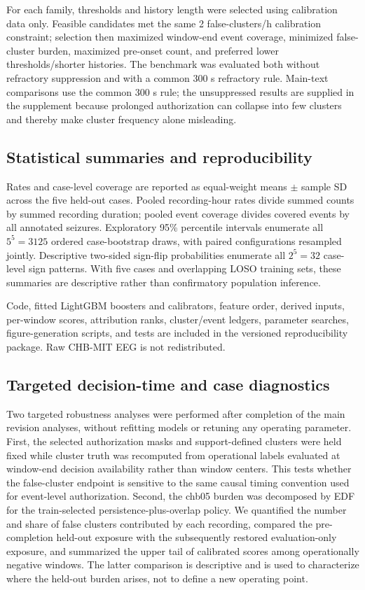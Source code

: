 \documentclass[11pt,a4paper]{article}
\begin{document}
For each family, thresholds and history length were selected using calibration data only. Feasible candidates met the same 2 false-clusters/h calibration constraint; selection then maximized window-end event coverage, minimized false-cluster burden, maximized pre-onset count, and preferred lower thresholds/shorter histories. The benchmark was evaluated both without refractory suppression and with a common 300 s refractory rule. Main-text comparisons use the common 300 s rule; the unsuppressed results are supplied in the supplement because prolonged authorization can collapse into few clusters and thereby make cluster frequency alone misleading.

\subsection{Statistical summaries and reproducibility}
\label{sec:statistics}
Rates and case-level coverage are reported as equal-weight means $\pm$ sample SD across the five held-out cases. Pooled recording-hour rates divide summed counts by summed recording duration; pooled event coverage divides covered events by all annotated seizures. Exploratory 95\% percentile intervals enumerate all $5^5=3125$ ordered case-bootstrap draws, with paired configurations resampled jointly. Descriptive two-sided sign-flip probabilities enumerate all $2^5=32$ case-level sign patterns. With five cases and overlapping LOSO training sets, these summaries are descriptive rather than confirmatory population inference.

Code, fitted LightGBM boosters and calibrators, feature order, derived inputs, per-window scores, attribution ranks, cluster/event ledgers, parameter searches, figure-generation scripts, and tests are included in the versioned reproducibility package. Raw CHB-MIT EEG is not redistributed.

\subsection{Targeted decision-time and case diagnostics}
\label{sec:targeted_diagnostics}
Two targeted robustness analyses were performed after completion of the main revision analyses, without refitting models or retuning any operating parameter. First, the selected authorization masks and support-defined clusters were held fixed while cluster truth was recomputed from operational labels evaluated at window-end decision availability rather than window centers. This tests whether the false-cluster endpoint is sensitive to the same causal timing convention used for event-level authorization. Second, the chb05 burden was decomposed by EDF for the train-selected persistence-plus-overlap policy. We quantified the number and share of false clusters contributed by each recording, compared the pre-completion held-out exposure with the subsequently restored evaluation-only exposure, and summarized the upper tail of calibrated scores among operationally negative windows. The latter comparison is descriptive and is used to characterize where the held-out burden arises, not to define a new operating point.
\end{document}
